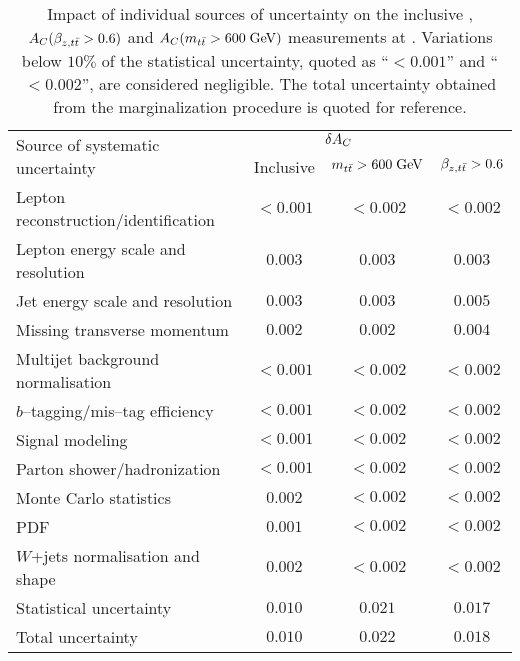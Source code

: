 \begin{table}[!htb]\centering
\begin{tabular}{l c c c}
\toprule
\multirow{2}{*}{Source of systematic uncertainty}  & \multicolumn{2}{c}{$\delta{\ensuremath{A_C}{}}$} \\
  & Inclusive & $m_{t\bar{t}}{} >600\; \mathrm{GeV}{}$ & $\beta_{z,t\bar{t}}{}>0.6$ \\
\midrule
Lepton reconstruction/identification    & $<0.001$ & $<0.002$ & $<0.002$\\
Lepton energy scale and resolution      & $0.003$    & $0.003$   &  $0.003$\\
Jet energy scale and resolution             & $0.003$    & $0.003$   &
$0.005$ \\
Missing transverse momentum           & $0.002$ & $0.002$
& $0.004$\\
Multijet background normalisation    & $<0.001$ & $<0.002$ & $<0.002$\\
$b$--tagging/mis--tag efficiency         & $<0.001$  & $<0.002$ & $<0.002$\\
Signal modeling                                       & $<0.001$ &
$<0.002$ & $<0.002$\\
Parton shower/hadronization             & $<0.001$  & $<0.002$ & $<0.002$\\
Monte Carlo statistics                         & $0.002$  & $<0.002$ & $<0.002$\\
PDF                                                      & $0.001$  & $<0.002$  & $<0.002$\\
$W$+jets normalisation and shape     & $0.002$  & $<0.002$ & $<0.002$\\
\midrule
Statistical uncertainty                         & $0.010$ & $0.021$ & $0.017$\\
\midrule
Total uncertainty                                & $0.010$ & $0.022$ & $0.018$\\
\bottomrule
\end{tabular}
\caption{Impact of individual sources of uncertainty on the inclusive
  \ac{}, \mbox{$A_C{}(\beta_{z,t\bar{t}}{}>0.6)$} and \mbox{$A_C{}(m_{t\bar{t}}{}>600
    \; \mathrm{GeV}{})$} measurements at \seventev{}. Variations below $10\%$ of the
  statistical uncertainty, quoted as ``$<0.001$'' and ``$<0.002$'',
  are considered negligible. The total uncertainty obtained from the
  marginalization procedure is quoted for reference.}
\label{tab:systematics}
\end{table}

